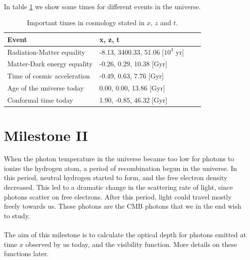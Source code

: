 \documentclass{aa}
\begin{document}
\noindent
\\
In table \ref{tab:M1_times} we show some times for different events in the universe.
\begin{table}[H] %
     \caption{Important times in cosmology stated in $x$, $z$ and $t$.} %
     \label{tab:M1_times}
     \begin{tabular}{l|l|r|l} %
       \textbf{Event} & \textbf{x, z, t}\\ %
       \hline %
       Radiation-Matter equality & -8.13,  3400.33, 51.06 [$10^3$ yr] \\
       Matter-Dark energy equality & -0.26, 0.29, 10.38 [Gyr]        \\
       Time of cosmic acceleration & -0.49, 0.63, 7.76 [Gyr]\\
       Age of the universe today & 0.00, 0.00, 13.86 [Gyr]  \\
       Conformal time today  & 1.90, -0.85, 46.32 [Gyr]\\

       \hline
     \end{tabular}
 \end{table}



\section{Milestone II}
When the photon temperature in the universe became too low for photons to ionize the hydrogen atom, a period of recombination begun in the universe. In this period, neutral hydrogen
started to form, and the free electron density decreased. This led to a dramatic change in the scattering rate of light, since photons scatter on free electrons. After this period, light could travel mostly freely towards us. These 
photons are the CMB photons that we in the end wish to study.\\
\\  
The aim of this milestone is to calculate the optical depth for photons emitted at time $x$ observed by us today, and the visibility function. More details on these functions later. 
\end{document}
